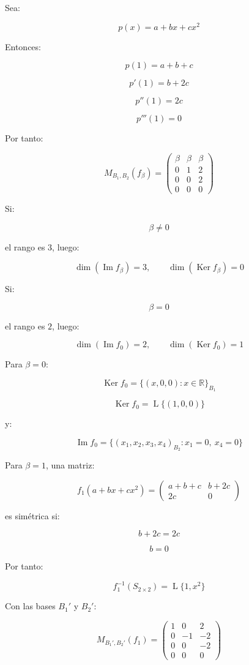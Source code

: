 \documentclass[11pt,a4paper]{article}
\newcommand{\R}{\mathbb{R}}
\newcommand{\Ker}{\operatorname{Ker}}
\newcommand{\Ima}{\operatorname{Im}}
\newcommand{\Span}{\operatorname{L}}
\begin{document}
	Sea:

	\[
	p(x)=a+bx+cx^2
	\]

	Entonces:

	\[
	p(1)=a+b+c
	\]

	\[
	p'(1)=b+2c
	\]

	\[
	p''(1)=2c
	\]

	\[
	p'''(1)=0
	\]

	Por tanto:

	\[
	\boxed{
	M_{B_1,B_2}(f_\beta)
	=
	\begin{pmatrix}
	\beta&\beta&\beta\\
	0&1&2\\
	0&0&2\\
	0&0&0
	\end{pmatrix}
	}
	\]

	Si:

	\[
	\beta\neq0
	\]

	el rango es $3$, luego:

	\[
	\boxed{
	\dim(\Ima f_\beta)=3,
	\qquad
	\dim(\Ker f_\beta)=0
	}
	\]

	Si:

	\[
	\beta=0
	\]

	el rango es $2$, luego:

	\[
	\boxed{
	\dim(\Ima f_0)=2,
	\qquad
	\dim(\Ker f_0)=1
	}
	\]

	Para $\beta=0$:

	\[
	\Ker f_0
	=
	\{(x,0,0):x\in\R\}_{B_1}
	\]

	\[
	\boxed{
	\Ker f_0=\Span\{(1,0,0)\}
	}
	\]

	y:

	\[
	\Ima f_0
	=
	\{(x_1,x_2,x_3,x_4)_{B_2}:x_1=0,\ x_4=0\}
	\]

	Para $\beta=1$, una matriz:

	\[
	f_1(a+bx+cx^2)
	=
	\begin{pmatrix}
	a+b+c&b+2c\\
	2c&0
	\end{pmatrix}
	\]

	es simétrica si:

	\[
	b+2c=2c
	\]

	\[
	b=0
	\]

	Por tanto:

	\[
	\boxed{
	f_1^{-1}(S_{2\times2})
	=
	\Span\{1,x^2\}
	}
	\]

	Con las bases $B_1'$ y $B_2'$:

	\[
	\boxed{
	M_{B_1',B_2'}(f_1)
	=
	\begin{pmatrix}
	1&0&2\\
	0&-1&-2\\
	0&0&-2\\
	0&0&0
	\end{pmatrix}
	}
	\]
\end{document}
